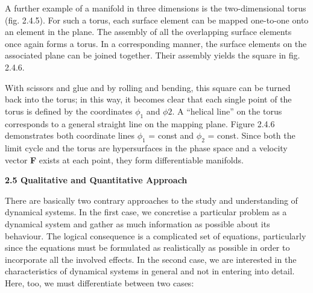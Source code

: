\documentclass[12pt]{article}
\begin{document}
\hfill

A further example of a manifold in three dimensions is the two-dimensional torus
(fig. 2.4.5). For such a torus, each surface element can be mapped one-to-one onto
an element in the plane. The assembly of all the overlapping surface elements once
again forms a torus. In a corresponding manner, the surface elements on the associated
plane can be joined together. Their assembly yields the square in fig. 2.4.6.

\hfill

With scissors and glue and by rolling and bending, this square can be turned back
into the torus; in this way, it becomes clear that each single point of the torus is
defined by the coordinates $\phi_1$ and $\phi2$. A “helical line” on the torus corresponds
to a general straight line on the mapping plane. Figure 2.4.6 demonstrates both
coordinate lines $\phi_1$ = const and $\phi_2$ = const. Since both the limit cycle and the
torus are hypersurfaces in the phase space and a velocity vector \textbf{F} exists at each
point, they form differentiable manifolds.

\hfill

\textbf{2.5 Qualitative and Quantitative Approach}

\hfill

There are basically two contrary approaches to the study and understanding of
dynamical systems. In the first case, we concretise a particular problem as a dynamical
system and gather as much information as possible about its behaviour.
The logical consequence is a complicated set of equations, particularly since the
equations must be formulated as realistically as possible in order to incorporate all
the involved effects. In the second case, we are interested in the characteristics of
dynamical systems in general and not in entering into detail. Here, too, we must
differentiate between two cases:
\end{document}
